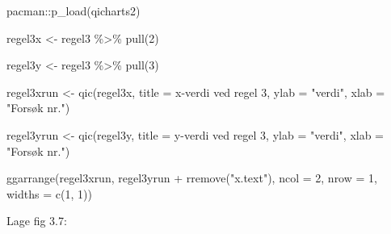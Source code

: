 \documentclass[
]{book}
\newenvironment{Shaded}{\begin{snugshade}}{\end{snugshade}}
\newcommand{\AttributeTok}[1]{\textcolor[rgb]{0.77,0.63,0.00}{#1}}
\newcommand{\DecValTok}[1]{\textcolor[rgb]{0.00,0.00,0.81}{#1}}
\newcommand{\FunctionTok}[1]{\textcolor[rgb]{0.00,0.00,0.00}{#1}}
\newcommand{\NormalTok}[1]{#1}
\newcommand{\OtherTok}[1]{\textcolor[rgb]{0.56,0.35,0.01}{#1}}
\newcommand{\SpecialCharTok}[1]{\textcolor[rgb]{0.00,0.00,0.00}{#1}}
\newcommand{\StringTok}[1]{\textcolor[rgb]{0.31,0.60,0.02}{#1}}
\begin{document}
\begin{Shaded}
\begin{Highlighting}[]
\NormalTok{pacman}\SpecialCharTok{::}\FunctionTok{p\_load}\NormalTok{(qicharts2)}

\NormalTok{regel3x }\OtherTok{\textless{}{-}}\NormalTok{ regel3 }\SpecialCharTok{\%\textgreater{}\%} \FunctionTok{pull}\NormalTok{(}\DecValTok{2}\NormalTok{)}

\NormalTok{regel3y }\OtherTok{\textless{}{-}}\NormalTok{ regel3 }\SpecialCharTok{\%\textgreater{}\%} \FunctionTok{pull}\NormalTok{(}\DecValTok{3}\NormalTok{)}

\NormalTok{regel3xrun }\OtherTok{\textless{}{-}} \FunctionTok{qic}\NormalTok{(regel3x, }\AttributeTok{title =} \StringTok{\textquotesingle{}x{-}verdi ved regel 3\textquotesingle{}}\NormalTok{, }\AttributeTok{ylab =} \StringTok{"verdi"}\NormalTok{, }\AttributeTok{xlab =} \StringTok{"Forsøk nr."}\NormalTok{)}

\NormalTok{regel3yrun }\OtherTok{\textless{}{-}} \FunctionTok{qic}\NormalTok{(regel3y, }\AttributeTok{title =} \StringTok{\textquotesingle{}y{-}verdi ved regel 3\textquotesingle{}}\NormalTok{, }\AttributeTok{ylab =} \StringTok{"verdi"}\NormalTok{, }\AttributeTok{xlab =} \StringTok{"Forsøk nr."}\NormalTok{)}

\FunctionTok{ggarrange}\NormalTok{(regel3xrun, regel3yrun }\SpecialCharTok{+} \FunctionTok{rremove}\NormalTok{(}\StringTok{"x.text"}\NormalTok{), }\AttributeTok{ncol =} \DecValTok{2}\NormalTok{, }\AttributeTok{nrow =} \DecValTok{1}\NormalTok{,  }\AttributeTok{widths =} \FunctionTok{c}\NormalTok{(}\DecValTok{1}\NormalTok{, }\DecValTok{1}\NormalTok{))}
\end{Highlighting}
\end{Shaded}

Lage fig 3.7:
\end{document}
